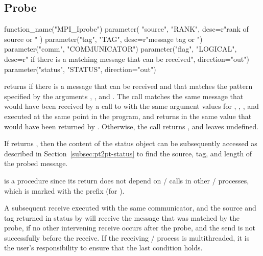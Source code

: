 \subsection{Probe}
\label{subsec:pt2pt-probe}

\begin{mpi-binding}
    function_name("MPI_Iprobe")
    parameter(
        "source", "RANK", desc=r"rank of source or "
    )
    parameter("tag", "TAG", desc=r"message tag or ")
    parameter("comm", "COMMUNICATOR")
    parameter("flag", "LOGICAL", desc=r" if there is a matching message that can be received", direction="out")
    parameter("status", "STATUS", direction="out")
\end{mpi-binding}

returns 
if there is a message that can be received
and that matches the pattern specified by the
arguments , , and .
The call matches the same message
that would have been received by a call to  with the same argument values for , ,
, and  executed at the same point in the program, and returns in
 the same
value that would have been returned by .
Otherwise, the call returns , and leaves 
undefined.

If  returns ,
then the content of the status object can be subsequently
accessed as described in Section~\ref{subsec:pt2pt-status} to find the
source, tag, and length of the probed message.

 is a  procedure since its return does not depend
on \MPI/ calls in other \MPI/ processes, which is marked with the prefix  (for ).

A subsequent receive executed with the same communicator, and the source and
tag returned in status by  will receive the message that
was matched by the probe, if no other intervening receive occurs after the
probe, and the send is not successfully  before the receive.
If the receiving \MPI/ process is multithreaded, it is the user's
responsibility to ensure that the last condition holds.

